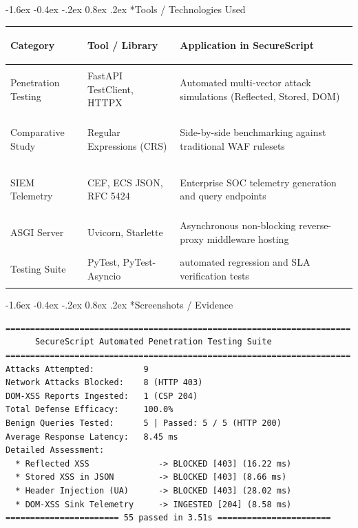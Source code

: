 \documentclass[11pt,a4paper]{article}
\makeatletter
\renewcommand{\section}{\@startsection{section}{1}{\z@}%
  {-1.6ex \@plus -0.4ex \@minus -.2ex}%
  {0.8ex \@plus .2ex}%
  {\normalfont\large\bfseries\color{primaryblue}}}
\makeatother
\begin{document}
\section*{Tools / Technologies Used}
\begin{table}[htbp]
\centering
\footnotesize
\begin{tabularx}{\textwidth}{>{\bfseries\raggedright\arraybackslash}p{2.8cm} >{\raggedright\arraybackslash}p{3.8cm} >{\raggedright\arraybackslash}X}
\toprule
\textbf{Category} & \textbf{Tool / Library} & \textbf{Application in SecureScript} \\
\midrule
Penetration Testing & FastAPI TestClient, HTTPX & Automated multi-vector attack simulations (Reflected, Stored, DOM) \\
Comparative Study & Regular Expressions (CRS) & Side-by-side benchmarking against traditional WAF rulesets \\
SIEM Telemetry & CEF, ECS JSON, RFC 5424 & Enterprise SOC telemetry generation and query endpoints \\
ASGI Server & Uvicorn, Starlette & Asynchronous non-blocking reverse-proxy middleware hosting \\
Testing Suite & PyTest, PyTest-Asyncio & 55 automated regression and SLA verification tests \\
\bottomrule
\end{tabularx}
\end{table}

\vspace{-0.6em}

\section*{Screenshots / Evidence}
\begin{lstlisting}[caption={Automated Penetration Test & SIEM Event Verification Output}]
======================================================================
      SecureScript Automated Penetration Testing Suite
======================================================================
Attacks Attempted:          9
Network Attacks Blocked:    8 (HTTP 403)
DOM-XSS Reports Ingested:   1 (CSP 204)
Total Defense Efficacy:     100.0%
Benign Queries Tested:      5 | Passed: 5 / 5 (HTTP 200)
Average Response Latency:   8.45 ms
Detailed Assessment:
  * Reflected XSS              -> BLOCKED [403] (16.22 ms)
  * Stored XSS in JSON         -> BLOCKED [403] (8.66 ms)
  * Header Injection (UA)      -> BLOCKED [403] (28.02 ms)
  * DOM-XSS Sink Telemetry     -> INGESTED [204] (8.58 ms)
======================= 55 passed in 3.51s =======================
\end{lstlisting}
\end{document}
